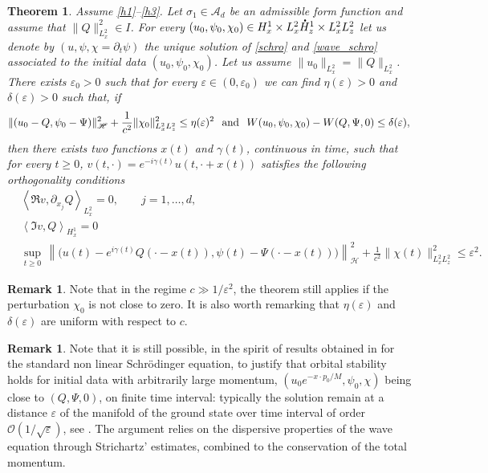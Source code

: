 \documentclass[JEP,XML,SOM,NoEqCountersInSection,NoFloatCountersInSection,Unicode,published]{cedram}
\let\epsilon\varepsilon
\newtheorem{theo}[lemma]{Theorem}
\theoremstyle{definition}
\newtheorem{rmk}[lemma]{Remark}
\newcommand*{\overbigdot}[1]{%
\accentset{\mbox{\large\bfseries .}}{#1}}
\begin{document}
\begin{theo}\label{orbital_stab_2}
Assume \eqref{h1}--\eqref{h3}. Let $\sigma_{1}\in\mathscr{A}_{d}$ be an admissible form function and assume that $\|Q\|_{L_{x}^{2}}^{2}\in I$.
For every $(u_{0},\psi_{0},\chi_{0})\in H_{x}^{1}\times L_{x}^{2}\overbigdot{H}_{z}^{1}\times L_{x}^{2}L_{z}^{2}$ let us denote by $(u,\psi,\chi=\partial_t\psi)$ the unique solution of \eqref{schro} and \eqref{wave_schro} associated to the initial data $(u_{0},\psi_{0},\chi_{0})$. Let us assume $\|u_{0}\|_{L_{x}^{2}}=\|Q\|_{L_{x}^{2}}$. There exists $\varepsilon_{0}>0$ such that for every $\varepsilon\in(0,\varepsilon_{0})$ we can find $\eta(\varepsilon)>0$ and $\delta(\varepsilon)>0$ such that, if
\[
\|(u_{0}-Q,\psi_{0}-\Psi)\|_{\mathscr {H}}^{2}+\frac{1}{c^{2}}\|\chi_{0}\|_{L_{x}^{2}L_{z}^{2}}^{2}\leq\eta(\varepsilon)^{2} \hspace{0.25cm}\text{and}\hspace{0.25cm} W(u_{0},\psi_{0},\chi_{0})-W(Q,\Psi,0)\leq\delta(\varepsilon),
\]
then there exists two functions $x(t)$ and $\gamma(t)$, continuous in time, such that for every $t\geq 0$, $v(t,\cdot)=e^{-i\gamma(t)}u(t,\cdot+x(t))$ satisfies the following orthogonality conditions\vspace*{-3pt}
\begin{subequations}
\begin{align}
\label{ortho1}
&\left\langle\Re  v,\partial_{x_{j}}Q\right\rangle_{L_{x}^{2}}=0, \qquad j=1,\ldots,d,\\
\label{ortho2}
&\left\langle\Im  v,Q\right\rangle_{H_{x}^{1}}=0\\
\tag*{and}
&\underset{t\geq 0}{\sup}\,\left\|
\big(u(t)-e^{i\gamma(t)}Q(\cdot-x(t)),\psi(t)-\Psi(\cdot-x(t))\big)\right\|_{\mathscr {H}}^{2}+\frac{1}{c^{2}}\|\chi(t)\|_{L_{x}^{2}L_{z}^{2}}^{2}\leq\varepsilon^{2}.
\end{align}
\end{subequations}
\end{theo}

\begin{rmk}
Note that in the regime $c\gg 1/\varepsilon^{2}$, the theorem still applies if the perturbation $\chi_{0}$ is not close to zero.
It is also worth remarking that $\eta(\varepsilon)$ and $\delta(\varepsilon)$ are uniform with respect to $c$.
\end{rmk}

\begin{rmk} Note that it is still possible, in the spirit of results obtained in \cite{Faou} for the standard non linear Schrödinger equation, to justify that orbital stability holds for initial data with arbitrarily large momentum, $(u_0e^{-x\cdot p_0/M},\psi_0,\chi)$ being close to $(Q,\Psi,0)$, on finite time interval:
typically the solution remain at a distance $\epsilon$ of the manifold of the
ground state over time interval of order $\mathscr O(1/\sqrt\epsilon)$, see
\cite[Th.\,4.2.11 \& \S4.6]{LV_PhD}.
The argument relies on the dispersive properties
of the wave equation through Strichartz' estimates, combined to the conservation of the total momentum.
\end{rmk}
\end{document}
